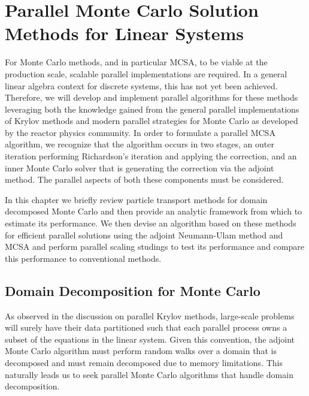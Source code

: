 \chapter{Parallel Monte Carlo Solution Methods for Linear Systems}
\label{ch:parallel_methods}
For Monte Carlo methods, and in particular MCSA, to be viable at the
production scale, scalable parallel implementations are required. In a
general linear algebra context for discrete systems, this has not yet
been achieved. Therefore, we will develop and implement parallel
algorithms for these methods leveraging both the knowledge gained from
the general parallel implementations of Krylov methods and modern
parallel strategies for Monte Carlo as developed by the reactor
physics community. In order to formulate a parallel MCSA algorithm, we
recognize that the algorithm occurs in two stages, an outer iteration
performing Richardson's iteration and applying the correction, and an
inner Monte Carlo solver that is generating the correction via the
adjoint method. The parallel aspects of both these components must be
considered. 

In this chapter we briefly review particle transport
methods for domain decomposed Monte Carlo and then provide an analytic
framework from which to estimate its performance. We then devise an
algorithm based on these methods for efficient parallel solutions
using the adjoint Neumann-Ulam method and MCSA and perform parallel
scaling studings to test its performance and compare this performance
to conventional methods.

\section{Domain Decomposition for Monte Carlo}
\label{sec:msod}
As observed in the discussion on parallel Krylov methods, large-scale
problems will surely have their data partitioned such that each
parallel process owns a subset of the equations in the linear
system. Given this convention, the adjoint Monte Carlo algorithm must
perform random walks over a domain that is decomposed and must remain
decomposed due to memory limitations. This naturally leads us to seek
parallel Monte Carlo algorithms that handle domain decomposition.

